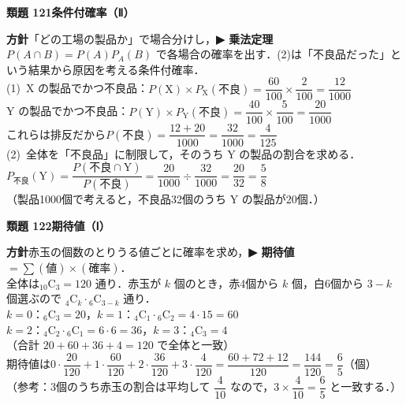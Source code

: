 \documentclass[a4paper,11pt]{ltjsarticle}
\newcommand{\ans}[2]{\Needspace{5\baselineskip}\vspace{6pt}%
  {\sffamily\bfseries 類題 #1\quad #2}\par}
\newcommand{\point}[1]{\textsf{\bfseries ▶ #1}}
\begin{document}
\ans{121}{条件付確率（Ⅱ）}
\begin{kai}
\textbf{方針}\quad 「どの工場の製品か」で場合分けし，\point{乗法定理 $P(A\cap B)=P(A)P_A(B)$} で各場合の確率を出す．(2)は「不良品だった」という結果から原因を考える条件付確率．\\[2pt]
(1)\ X の製品でかつ不良品：$P(\mathrm X)\times P_{\mathrm X}(\text{不良})=\dfrac{60}{100}\times\dfrac{2}{100}=\dfrac{12}{1000}$\\[2pt]
\hspace*{1.5em}Y の製品でかつ不良品：$P(\mathrm Y)\times P_{\mathrm Y}(\text{不良})=\dfrac{40}{100}\times\dfrac{5}{100}=\dfrac{20}{1000}$\\[2pt]
\hspace*{1.5em}これらは排反だから\quad $P(\text{不良})=\dfrac{12+20}{1000}=\dfrac{32}{1000}=\dfrac{4}{125}$\\[2pt]
(2)\ 全体を「不良品」に制限して，そのうち Y の製品の割合を求める．\\
\hspace*{1.5em}$P_{\text{不良}}(\mathrm Y)=\dfrac{P(\text{不良}\cap\mathrm Y)}{P(\text{不良})}=\dfrac{20}{1000}\div\dfrac{32}{1000}=\dfrac{20}{32}=\dfrac58$\\
\hspace*{1.5em}（製品1000個で考えると，不良品32個のうち Y の製品が20個．）
\end{kai}

\ans{122}{期待値（Ⅰ）}
\begin{kai}
\textbf{方針}\quad 赤玉の個数のとりうる値ごとに確率を求め，\point{期待値 $=\sum(\text{値})\times(\text{確率})$}．\\[2pt]
全体は\quad ${}_{10}\mathrm C_3=120$ 通り．赤玉が $k$ 個のとき，赤4個から $k$ 個，白6個から $3-k$ 個選ぶので ${}_4\mathrm C_k\cdot{}_6\mathrm C_{3-k}$ 通り．\\[2pt]
\hspace*{1.5em}$k=0$：${}_6\mathrm C_3=20$，\quad $k=1$：${}_4\mathrm C_1\cdot{}_6\mathrm C_2=4\cdot15=60$\\
\hspace*{1.5em}$k=2$：${}_4\mathrm C_2\cdot{}_6\mathrm C_1=6\cdot6=36$，\quad $k=3$：${}_4\mathrm C_3=4$\\
\hspace*{1.5em}（合計 $20+60+36+4=120$ で全体と一致）\\[2pt]
期待値は\quad $0\cdot\dfrac{20}{120}+1\cdot\dfrac{60}{120}+2\cdot\dfrac{36}{120}+3\cdot\dfrac{4}{120}=\dfrac{60+72+12}{120}=\dfrac{144}{120}=\dfrac65$（個）\\[2pt]
（参考：3個のうち赤玉の割合は平均して $\dfrac4{10}$ なので，$3\times\dfrac4{10}=\dfrac65$ と一致する．）
\end{kai}
\end{document}
